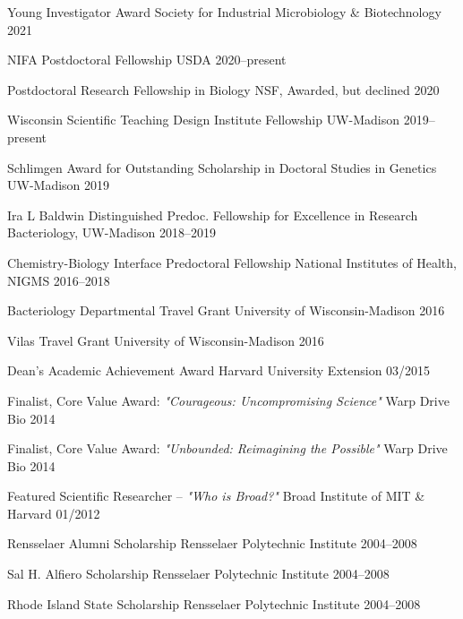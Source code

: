 

\begin{cvhonors}

\cvhonor
{Young Investigator Award}
{Society for Industrial Microbiology \& Biotechnology}
{2021}

\cvhonor
{NIFA Postdoctoral Fellowship}
{USDA}
{2020--present}

\cvhonor
{Postdoctoral Research Fellowship in Biology}
{NSF, Awarded, but declined}
{2020}
%

\cvhonor
{Wisconsin Scientific Teaching Design Institute Fellowship}
{UW-Madison}
{2019--present}

\cvhonor
{Schlimgen Award for Outstanding Scholarship in Doctoral Studies in Genetics}
{UW-Madison}
{2019}

\cvhonor
{Ira L Baldwin Distinguished Predoc. Fellowship for Excellence in Research}
{Bacteriology, UW-Madison}
{2018--2019}

\cvhonor
{Chemistry-Biology Interface Predoctoral Fellowship}
{National Institutes of Health, NIGMS}
{2016--2018}

\end{cvhonors} \begin{cvhonors}

%
%

\cvhonor
{Bacteriology Departmental Travel Grant}
{University of Wisconsin-Madison}
{2016}

\cvhonor
{Vilas Travel Grant}
{University of Wisconsin-Madison}
{2016}

\cvhonor
{Dean's Academic Achievement Award}
{Harvard University Extension}
{03/2015}

\cvhonor
{Finalist, Core Value Award: \textit{"Courageous: Uncompromising Science"}}
{Warp Drive Bio}
{2014}

\cvhonor
{Finalist, Core Value Award: \textit{"Unbounded: Reimagining the Possible"}}
{Warp Drive Bio}
{2014}

\cvhonor
{Featured Scientific Researcher -- \textit{"Who is Broad?"}}
{Broad Institute of MIT \& Harvard}
{01/2012}

\cvhonor
{Rensselaer Alumni Scholarship}
{Rensselaer Polytechnic Institute}
{2004--2008}

\cvhonor
{Sal H. Alfiero Scholarship}
{Rensselaer Polytechnic Institute}
{2004--2008}

\cvhonor
{Rhode Island State Scholarship}
{Rensselaer Polytechnic Institute}
{2004--2008}

\end{cvhonors}
